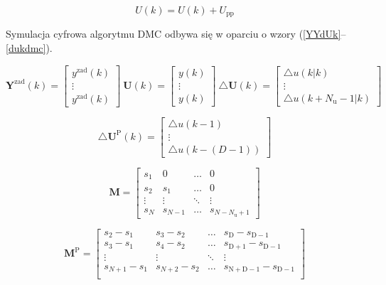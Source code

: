 \begin{equation}
U(k) = U(k) + U_{\mathrm{pp}}
\label{upp}
\end{equation}

Symulacja cyfrowa algorytmu DMC odbywa się w oparciu o wzory (\ref{YYdUk}--\ref{dukdmc}).

\begin{equation}
\boldsymbol{Y}^{\mathrm{zad}}(k)=\left[
\begin{array}{c}
y^{\mathrm{zad}}(k)\\
\vdots\\
y^{\mathrm{zad}}(k)
\end{array}
\right] \
\boldsymbol{U}(k)=\left[
\begin{array}{c}
y(k)\\
\vdots\\
y(k)
\end{array}
\right] \
\triangle \boldsymbol{U}(k)=\left[
\begin{array}{c}
\triangle u(k|k)\\
\vdots\\
\triangle u(k+N_{\mathrm{u}}-1|k)
\end{array}
\right] \
\label{YYdUk}
\end{equation}

\begin{equation}
\triangle \boldsymbol{U}^{\mathrm{P}}(k)=\left[
\begin{array}{c}
\triangle u(k-1)\\
\vdots\\
\triangle u(k-(D-1))
\end{array}
\right]
\label{dUp}
\end{equation}

\begin{equation}
\boldsymbol{M}=\left[
\begin{array}
{cccc}
s_{1} & 0 & \ldots & 0\\
s_{2} & s_{1} & \ldots & 0\\
\vdots & \vdots & \ddots & \vdots\\
s_{N} & s_{N-1} & \ldots &  s_{N-N_{\mathrm{u}}+1}
\end{array}
\right]
\label{Marray}
\end{equation}

\begin{equation}
\boldsymbol{M}^{\mathrm{P}}=\left[
\begin{array}
{cccc}
s_{2} - s_{1} & s_{3} - s_{2} & \ldots & s_{\mathrm{D}} - s_{\mathrm{D-1}}\\
s_{3} - s_{1} & s_{4} - s_{2} & \ldots & s_{\mathrm{D+1}} - s_{\mathrm{D-1}}\\
\vdots & \vdots & \ddots & \vdots\\
s_{N+1} - s_{1} & s_{N+2} - s_{2} & \ldots & s_{\mathrm{N+D-1}} - s_{\mathrm{D-1}}\\
\end{array}
\right]
\label{MParray}
\end{equation}

